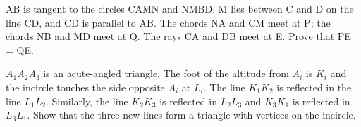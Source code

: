 \item AB is tangent to the circles CAMN and NMBD. M lies between C and D on the line CD, and CD is parallel to AB. The chords NA and CM meet at P; the chords NB and MD meet at Q. The rays CA and DB meet at E. Prove that PE = QE.\\

\item $A_1A_2A_3$ is an acute-angled triangle. The foot of the altitude from $A_i$ is $K_i$ and the incircle touches the side opposite $A_i$ at $L_i$. The line $K_1K_2$ is reflected in the line $L_1L_2$. Similarly, the line $K_2K_3$ is reflected in $L_2L_3$ and $K_3K_1$ is reflected in $L_3L_1$. Show that the three new lines form a triangle with vertices on the incircle.


